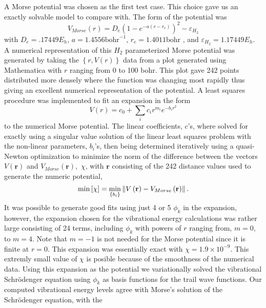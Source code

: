 \documentclass[12pt,thmsa]{article}
\begin{document}
A Morse potential was chosen as the first test case. This choice gave us an
exactly solvable model to compare with. The form of the potential was 
\begin{equation}
V_{Morse}\left( r\right) =D_e\left( 1-e^{-a\left( r-r_e\right) }\right)
^2-\varepsilon _{H_2}
\end{equation}
with $D_e=.17449E_h$, $a=1.4556\mathrm{bohr}^{-1}$, $r_e=1.4011\mathrm{bohr}$%
, and $\varepsilon _{H_2}=1.17449E_h.$ A numerical representation of this $%
H_2$ parameterized Morse potential was generated by taking the $\left\{
r,V\left( r\right) \right\} $ data from a plot generated using Mathematica
\cite{Mathematica} with $r$ ranging from 0 to 100 bohr. This plot gave 242
points distributed more densely where the function was changing most rapidly
thus giving an excellent numerical representation of the potential. A least
squares procedure was implemented to fit an expansion in the form 
\begin{equation}
V\left( r\right) =c_0+\sum_ic_ir^{m_i}e^{-b_ir^2}
\end{equation}
to the numerical Morse potential. The linear coefficients, $c$'s, where
solved for exactly using a singular value solution of the linear least
squares problem with the non-linear parameters, $b_i$'s, then being
determined iteratively using a quasi-Newton optimization to minimize the
norm of the difference between the vectors $V\left( \mathbf{r}\right) $ and $%
V_{Morse}\left( \mathbf{r}\right) ,$ $\chi $, with $\mathbf{r}$ consisting
of the 242 distance values used to generate the numeric potential, 
\begin{equation}
\min \left[ \chi \right] =\min_{\left\{ b_i\right\} }\left\| V\left( \mathbf{%
r}\right) -V_{Morse}\left( \mathbf{r}\right) \right\| .
\end{equation}
It was possible to generate good fits using just 4 or 5 $\phi _k$ in the
expansion, however, the expansion chosen for the vibrational energy
calculations was rather large consisting of 24 terms, including $\phi _k$
with powers of $r$ ranging from, $m=0$, to $m=4$. Note that $m=-1$ is not
needed for the Morse potential since it is finite at $r=0$. This expansion
was essentially exact with $\chi =1.9\times 10^{-9}$. This extremly small
value of $\chi $ is posible because of the smoothness of the numerical data.
Using this expansion as the potential we variationally solved the
vibrational Schr\"{o}denger equation using $\phi _k$ as basis functions for
the trail wave functions. Our computed vibrational energy levels agree with
Morse's solution of the Schr\"{o}denger equation\cite{Morse29}, with the
\end{document}
